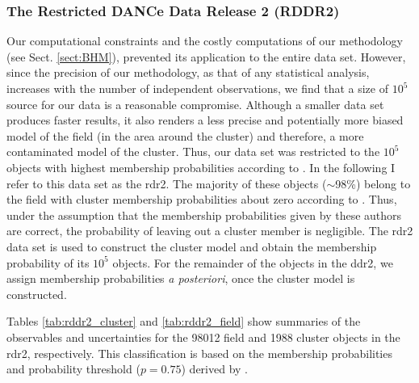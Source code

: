 \subsubsection{The Restricted DANCe Data Release 2 (RDDR2)}
Our computational constraints and the costly computations of our methodology (see Sect. \ref{sect:BHM}), prevented its application to the entire data set. However, since the precision of our methodology, as that of any statistical analysis, increases with the number of independent observations, we find that a size of $10^5$ source for our data is a reasonable compromise. Although a smaller data set produces faster results, it also renders a less precise and potentially more biased model of the field (in the area around the cluster) and therefore, a more contaminated model of the cluster. Thus, our data set was restricted to the $10^5$ objects with highest membership probabilities according to \citet{Bouy2015}. In the following I refer to this data set as the \gls{rdr2}. The majority of these objects ($\sim$98\%) belong to the field with cluster membership probabilities about zero according to \citet{Sarro2014,Bouy2015}. Thus, under the assumption that the membership probabilities given by these authors are correct, the probability of leaving out a cluster member is negligible. The \gls{rdr2} data set is used to construct the cluster model and obtain the membership probability of its $10^5$ objects. For the remainder of the objects in the \gls{ddr2}, we assign membership probabilities \emph{a posteriori}, once the cluster model is constructed. 

Tables \ref{tab:rddr2_cluster} and \ref{tab:rddr2_field} show summaries of the observables and uncertainties for the 98012 field and 1988 cluster objects in the \gls{rdr2}, respectively. This classification is based on the membership probabilities and probability threshold ($p=0.75$) derived by \citet{Bouy2015}.

